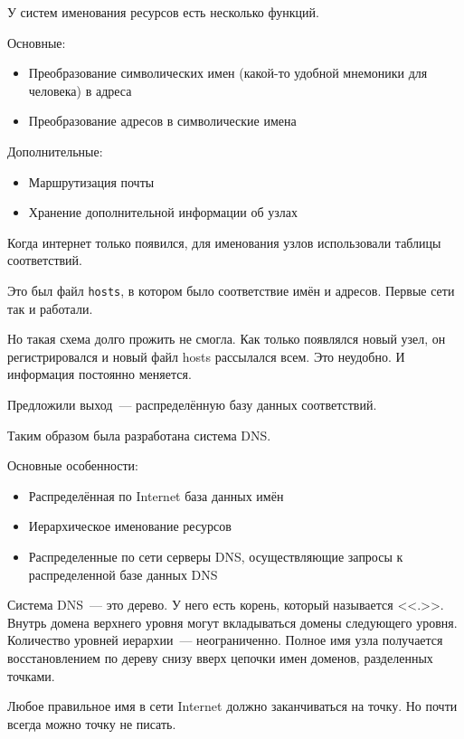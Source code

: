 
У систем именования ресурсов есть несколько функций.

Основные:
\begin{itemize}
    \item Преобразование символических имен (какой-то удобной мнемоники для человека) в адреса
    \item Преобразование адресов в символические имена
\end{itemize}

Дополнительные:
\begin{itemize}
    \item Маршрутизация почты
    \item Хранение дополнительной информации об узлах
\end{itemize}

Когда интернет только появился, для именования узлов использовали таблицы соответствий.

Это был файл {\tt hosts}, в котором было соответствие имён и адресов. Первые сети так и работали.

Но такая схема долго прожить не смогла. Как только появлялся новый узел, он регистрировался и новый файл hosts рассылался всем. Это неудобно. И информация постоянно меняется.

Предложили выход~--- распределённую базу данных соответствий.

Таким образом была разработана система DNS.

Основные особенности:
\begin{itemize}
    \item Распределённая по Internet база данных имён
    \item Иерархическое именование ресурсов
    \item Распределенные по сети серверы DNS, осуществляющие запросы к распределенной базе данных DNS
\end{itemize}

Система DNS~--- это дерево. У него есть корень, который называется <<.>>. Внутрь домена верхнего уровня могут вкладываться домены следующего уровня. Количество уровней иерархии~--- неограниченно. Полное имя узла получается восстановлением по дереву снизу вверх цепочки имен доменов, разделенных точками.

Любое правильное имя в сети Internet должно заканчиваться на точку. Но почти всегда можно точку не писать.


